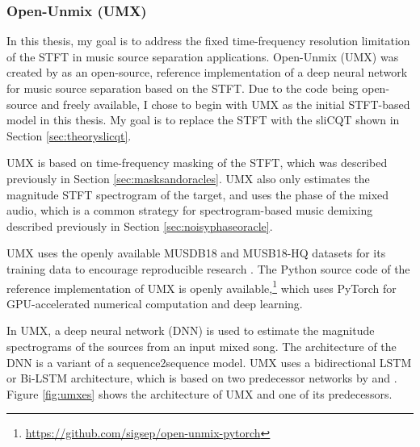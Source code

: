 \documentclass[report.tex]{subfiles}
\begin{document}
\subsubsection{Open-Unmix (UMX)}
\label{sec:umx}

In this thesis, my goal is to address the fixed time-frequency resolution limitation of the STFT in music source separation applications. Open-Unmix (UMX) was created by \textcite{umx} as an open-source, reference implementation of a deep neural network for music source separation based on the STFT. Due to the code being open-source and freely available, I chose to begin with UMX as the initial STFT-based model in this thesis. My goal is to replace the STFT with the sliCQT shown in Section \ref{sec:theoryslicqt}.

UMX is based on time-frequency masking of the STFT, which was described previously in Section \ref{sec:masksandoracles}. UMX also only estimates the magnitude STFT spectrogram of the target, and uses the phase of the mixed audio, which is a common strategy for spectrogram-based music demixing described previously in Section \ref{sec:noisyphaseoracle}.

UMX uses the openly available MUSDB18 and MUSB18-HQ datasets for its training data \parencite{musdb18, musdb18hq} to encourage reproducible research \parencite{umx}. The Python source code of the reference implementation of UMX is openly available,\footnote{\url{https://github.com/sigsep/open-unmix-pytorch}} which uses PyTorch \parencite{pytorch} for GPU-accelerated numerical computation and deep learning.

In UMX, a deep neural network (DNN) is used to estimate the magnitude spectrograms of the sources from an input mixed song. The architecture of the DNN is a variant of a sequence2sequence model. UMX uses a bidirectional LSTM or Bi-LSTM architecture, which is based on two predecessor networks by \textcite{umxorig1} and \textcite{umxorig2}. Figure \ref{fig:umxes} shows the architecture of UMX and one of its predecessors.
\end{document}

